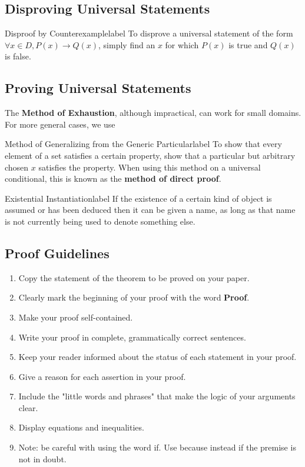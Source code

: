\documentclass[a4paper]{report}
\begin{document}
\subsection{Disproving Universal Statements}

\begin{definition}{Disproof by Counterexample}{label}
    To disprove a universal statement of the form $\forall x \in D, P(x) \to Q(x)$, simply find an
    $x$ for which $P(x)$ is true and $Q(x)$ is false.
\end{definition}

\subsection{Proving Universal Statements}

The \textbf{Method of Exhaustion}, although impractical, can work for small domains. For more general
cases, we use

\begin{definition}{Method of Generalizing from the Generic Particular}{label}
    To show that every element of a set satisfies a certain property, show that a particular but
    arbitrary chosen $x$ satisfies the property. When using this method on a universal conditional,
    this is known as the \textbf{method of direct proof}.
\end{definition}

\begin{definition}{Existential Instantiation}{label}
    If the existence of a certain kind of object is assumed or has been deduced then it can be
    given a name, as long as that name is not currently being used to denote something else.
\end{definition}

\subsection{Proof Guidelines}

\begin{enumerate}
    \item Copy the statement of the theorem to be proved on your paper.
    \item Clearly mark the beginning of your proof with the word \textbf{Proof}.
    \item Make your proof self-contained.
    \item Write your proof in complete, grammatically correct sentences.
    \item Keep your reader informed about the status of each statement in your proof.
    \item Give a reason for each assertion in your proof.
    \item Include the "little words and phrases" that make the logic of your arguments clear.
    \item Display equations and inequalities.
    \item Note: be careful with using the word if. Use because instead if the premise is not in doubt.
\end{enumerate}
\end{document}
